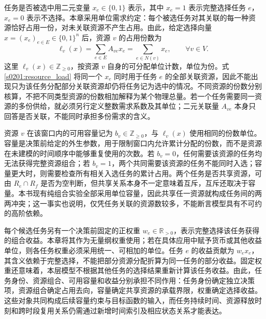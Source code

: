 任务是否被选中用二元变量 $x_e\in\{0,1\}$ 表示，其中 $x_e=1$ 表示完整选择任务 $e$，$x_e=0$ 表示不选择。本章采用单位需求约定：每个被选任务对其关联的每一种资源恰好占用一份，对未关联资源不产生占用。由此，给定选择向量 $x=(x_e)_{e\in E}\in\{0,1\}^{n}$ 后，资源 $v$ 的占用份数为
\begin{equation}
 \ell_v(x)
 =\sum_{e\in E}A_{ve}x_e
 =\sum_{e\in N(v)}x_e,
 \qquad \forall v\in V.
 \label{s0201:resource_load}
\end{equation}
这里 $\ell_v(x)\in\mathbb Z_{\geq 0}$，按资源 $v$ 自身的可分配单位计数，单位为份。式\eqref{s0201:resource_load} 将同一个 $x_e$ 同时用于任务 $e$ 的全部关联资源，因此不能出现只为该任务分配部分关联资源却仍将任务记为选中的情况。不同资源的份数分别核算，不把不同类型资源的份数相加解释为某个物理总量。若一个任务需要同一资源的多份供给，就必须另行定义整数需求系数及其单位；二元关联量 $A_{ve}$ 本身只回答是否关联，不能同时承担多份需求的含义。

资源 $v$ 在该窗口内的可用容量记为 $b_v\in\mathbb Z_{\geq 0}$，与 $\ell_v(x)$ 使用相同的份数单位。容量是决策前给定的外生参数，用于限制窗口内允许累计分配的份数，而不是资源在未建模的时间顺序中能够重复使用的次数。若 $b_v=0$，任何需要该资源的任务均无法获得完整资源组合；若 $b_v=1$，两个共同需要该资源的任务不能同时入选；容量更大时，则需要检查所有相关入选任务的累计占用。两个任务是否共享资源，可由 $R_e\cap R_f$ 是否为空判断，但共享关系本身不一定意味着互斥，互斥还取决于容量。本书现有纯组合实验全部采用单位容量，因此共享任一资源就构成任务间的两两冲突；这一事实也说明，仅凭任务关联的资源数较多，不能断言模型具有不可约的高阶依赖。

每个候选任务另有一个决策前固定的正权重 $w_e\in\mathbb R_{>0}$，表示完整选择该任务获得的组合收益。本章将其作为无量纲权重使用；若在具体应用中赋予货币或其他收益单位，则各任务权重必须采用统一、可相加的单位。任务 $e$ 的收益贡献为 $w_ex_e$，其含义依赖于完整选择，不能把部分资源分配折算为同一任务的部分收益。固定权重还意味着，本层模型不根据其他任务的选择结果重新计算该任务收益。由此，任务身份、资源组合、可用容量和收益分别承担不同作用：任务身份确定独立决策项，资源组合确定占用去向，容量确定共享资源的承载界限，权重确定选择收益。这些对象共同构成后续容量约束与目标函数的输入，而任务持续时间、资源释放时刻和跨时段复用关系仍需通过新增时间索引及相应状态关系才能表达。
